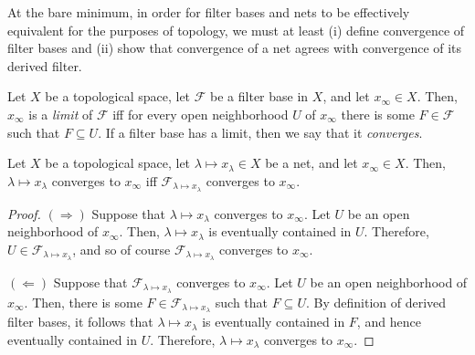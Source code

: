 At the bare minimum, in order for filter bases and nets to be effectively equivalent for the purposes of topology, we must at least (i) define convergence of filter bases and (ii) show that convergence of a net agrees with convergence of its derived filter.
\begin{dfn}
Let $X$ be a topological space, let $\mathcal{F}$ be a filter base in $X$, and let $x_\infty \in X$.  Then, $x_\infty$ is a \emph{limit} of $\mathcal{F}$ iff for every open neighborhood $U$ of $x_\infty$ there is some $F\in \mathcal{F}$ such that $F\subseteq U$.  If a filter base has a limit, then we say that it \emph{converges}.
\end{dfn}
\begin{prp}\label{prp4.3.6}
Let $X$ be a topological space, let $\lambda \mapsto x_\lambda \in X$ be a net, and let $x_\infty \in X$.  Then, $\lambda \mapsto x_\lambda$ converges to $x_\infty$ iff $\mathcal{F}_{\lambda \mapsto x_\lambda}$ converges to $x_\infty$.
\begin{proof}
$(\Rightarrow )$ Suppose that $\lambda \mapsto x_\lambda$ converges to $x_\infty$.  Let $U$ be an open neighborhood of $x_\infty$.  Then, $\lambda \mapsto x_\lambda$ is eventually contained in $U$.  Therefore, $U\in \mathcal{F}_{\lambda \mapsto x_\lambda}$, and so of course $\mathcal{F}_{\lambda \mapsto x_\lambda}$ converges to $x_\infty$.

\blankline
\noindent
$(\Leftarrow )$ Suppose that $\mathcal{F}_{\lambda \mapsto x_\lambda}$ converges to $x_\infty$.  Let $U$ be an open neighborhood of $x_\infty$.  Then, there is some $F\in \mathcal{F}_{\lambda \mapsto x_\lambda}$ such that $F\subseteq U$.  By definition of derived filter bases, it follows that $\lambda \mapsto x_\lambda$ is eventually contained in $F$, and hence eventually contained in $U$.  Therefore, $\lambda \mapsto x_\lambda$ converges to $x_\infty$.
\end{proof}
\end{prp}

